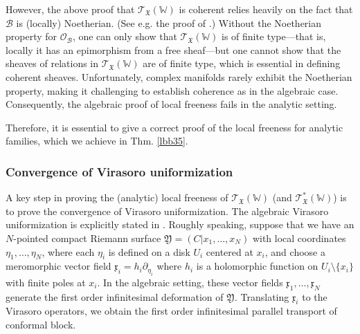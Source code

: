 \documentclass[11pt,b5paper,notitlepage]{article}
\theoremstyle{definition}
\theoremstyle{plain}
\newcommand{\scr}{\mathscr}
\newcommand{\xk}{\mathfrak x}
\newcommand{\Wbb}{\mathbb W}
\newcommand{\<}{\left\langle}
\renewcommand{\>}{\right\rangle}
\newcommand{\MO}{\mathcal{O}}
\newcommand{\MB}{\mathcal{B}}
\newcommand{\fx}{\mathfrak{X}}
\newcommand{\fy}{\mathfrak{Y}}
\numberwithin{equation}{subsection}
\begin{document}
However, the above proof that $\scr T_\fx(\Wbb)$ is coherent relies heavily on the fact that $\MB$ is (locally) Noetherian. (See e.g. the proof of \cite[Thm. 6.2.1]{NT-P1_conformal_blocks}.) Without the Noetherian property for $\MO_\MB$, one can only show that $\scr T_\fx(\Wbb)$ is of finite type---that is, locally it has an epimorphism from a free sheaf---but one cannot show that the sheaves of relations in $\scr T_\fx(\Wbb)$ are of finite type, which is essential in defining coherent sheaves. Unfortunately, complex manifolds rarely exhibit the Noetherian property, making it challenging to establish coherence as in the algebraic case. Consequently, the algebraic proof of local freeness fails in the analytic setting. 

Therefore, it is essential to give a correct proof of the local freeness for analytic families, which we achieve in Thm. \ref{lbb35}.



\subsubsection*{Convergence of Virasoro uniformization}

A key step in proving the (analytic) local freeness of $\scr T_\fx(\Wbb)$ (and $\scr T_\fx^*(\Wbb)$) is to prove the convergence of Virasoro uniformization. The algebraic Virasoro uniformization is explicitly stated in \cite[Ch. 17]{FB04}. Roughly speaking, suppose that we have an $N$-pointed compact Riemann surface $\fy=(C|x_1,\dots,x_N)$ with local coordinates $\eta_1,\dots,\eta_N$, where each $\eta_i$ is defined on a disk $U_i$ centered at $x_i$, and choose a meromorphic vector field $\xk_i=h_i\partial_{\eta_i}$ where $h_i$ is a holomorphic function on $U_i\setminus\{x_i\}$ with finite poles at $x_i$. In the algebraic setting, these vector fields $\xk_1,\dots,\xk_N$ generate the first order infinitesimal deformation of $\fy$. Translating $\xk_i$ to the Virasoro operators, we obtain the first order infinitesimal parallel transport of conformal block.
\end{document}

